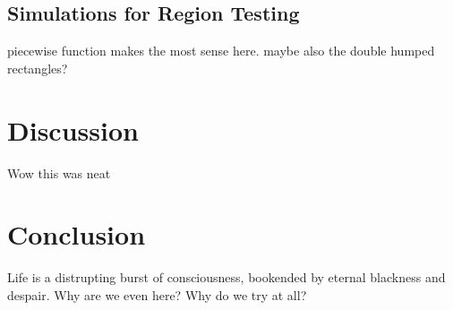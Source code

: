 \documentclass{article}
\begin{document}
\subsection{Simulations for Region Testing}

piecewise function makes the most sense here. maybe also the double humped rectangles?

\section{Discussion}

Wow this was neat

\section{Conclusion}

Life is a distrupting burst of consciousness, bookended by eternal blackness and despair. Why are we even here? Why do we try at all?
\end{document}
